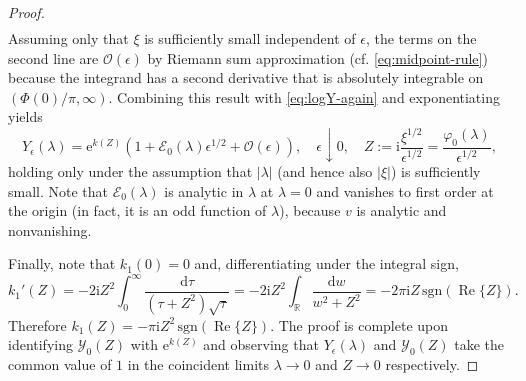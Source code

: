\documentclass[12pt]{amsart}
\numberwithin{equation}{section}
\newcommand{\dd}{\mathrm{d}}
\newcommand{\ee}{\mathrm{e}}
\newcommand{\ii}{\mathrm{i}}
\newcommand{\SP}{\lambda}
\newcommand{\phaseint}{\Phi}
\newcommand{\bigo}[1]{ \mathcal{O}\! \left( #1 \right) }
\DeclareMathOperator{\re}{Re}
\begin{document}
\begin{proof}
\begin{multline}
\end{multline}
Assuming only that $\xi$ is sufficiently small independent of $\epsilon$, the terms on the second line are $\bigo{\epsilon}$ by Riemann sum approximation (cf. \eqref{eq:midpoint-rule}) because the integrand has a second derivative that is absolutely integrable on $(\phaseint(0)/\pi,\infty)$.  Combining this result with \eqref{eq:logY-again} and exponentiating yields
\begin{equation}
Y_\epsilon(\SP)=\ee^{k(Z)}\left(1+\mathcal{E}_0(\SP)\epsilon^{1/2}+\bigo{\epsilon}\right),\quad\epsilon\downarrow 0,
\quad Z:=\ii\frac{\xi^{1/2}}{\epsilon^{1/2}}=\frac{\varphi_0(\SP)}{\epsilon^{1/2}},
\end{equation}
holding only under the assumption that $|\SP|$ (and hence also $|\xi|$) is sufficiently small.
Note that $\mathcal{E}_0(\SP)$ is analytic in $\SP$ at $\SP=0$ and vanishes to first order at the origin (in fact, it is an odd function of $\SP$), because $v$ is analytic and nonvanishing.

Finally, note that $k_1(0)=0$ and, differentiating under the integral sign,
\begin{equation}
k_1'(Z)=-2\ii Z^2\int_0^\infty\frac{\dd\tau}{(\tau+Z^2)\sqrt{\tau}} = -2\ii Z^2\int_\mathbb{R}\frac{\dd w}{w^2+Z^2}=
-2\pi \ii Z\,\mathrm{sgn}(\re\{Z\}).
\end{equation}
Therefore $k_1(Z)=-\pi \ii Z^2\,\mathrm{sgn}(\re\{Z\})$.   
The proof is complete upon identifying $\mathcal{Y}_0(Z)$ with $\ee^{k(Z)}$ and observing that $Y_\epsilon(\SP)$ and $\mathcal{Y}_0(Z)$ take the common value of $1$ in the coincident limits $\SP\to 0$ and $Z\to 0$ respectively.
\end{proof}

\Yzeroasymp*
\end{document}
